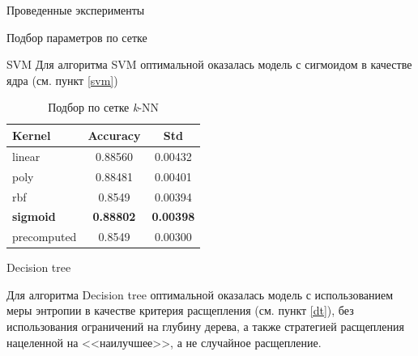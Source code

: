 \begin{section}{Проведенные эксперименты}
\begin{subsection}{Подбор параметров по сетке}
\begin{subsubsection}{SVM}
Для алгоритма SVM оптимальной оказалась модель с сигмоидом в качестве ядра (см. пункт \ref{svm})
  \begin{table}[H]
  \centering
  {\begin{tabular}{|l|c|c|}
  \hline
  \textbf{Kernel} & \textbf{Accuracy} & \textbf{Std} \\
  \hline
  linear & 0.88560 & 0.00432 \\
  \hline
  poly & 0.88481 & 0.00401 \\
  \hline
  rbf & 0.8549 & 0.00394 \\
  \hline
  \textbf{sigmoid} & \textbf{0.88802} & \textbf{0.00398} \\
  \hline
  precomputed & 0.8549 & 0.00300 \\
  \hline
  \end{tabular}}

  \caption{Подбор по сетке \textit{k}-NN}
  \label{grid:svm}
  \end{table}

\end{subsubsection}

\begin{subsubsection}{Decision tree}

Для алгоритма Decision tree оптимальной оказалась модель с использованием меры энтропии в качестве критерия расщепления (см. пункт \ref{dt}), без использования ограничений на глубину дерева, а также стратегией расщепления нацеленной на <<наилучшее>>, а не случайное расщепление.



\end{subsubsection}
\end{subsection}
\end{section}
